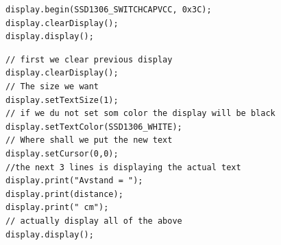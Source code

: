 \begin{lstlisting}[language=Arduino]
display.begin(SSD1306_SWITCHCAPVCC, 0x3C); 
display.clearDisplay();
display.display();
\end{lstlisting}
\newpage

\begin{lstlisting}[language=Arduino]
// first we clear previous display
display.clearDisplay();
// The size we want
display.setTextSize(1);
// if we du not set som color the display will be black
display.setTextColor(SSD1306_WHITE);
// Where shall we put the new text
display.setCursor(0,0);
//the next 3 lines is displaying the actual text
display.print("Avstand = ");
display.print(distance);
display.print(" cm");
// actually display all of the above
display.display(); 
\end{lstlisting}


